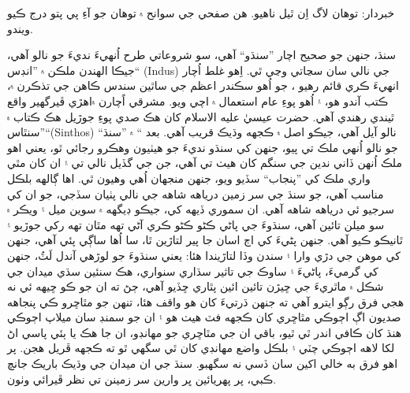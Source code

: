 \documentclass[a4paper]{article}
\begin{document}
\begin{flushright}
خبردار: توهان لاگ اِن ٿيل ناهيو. هن صفحي جي سوانح ۾ توهان جو آءِ پي پتو درج ڪيو ويندو.

سنڌ، جنهن جو صحيح اچار ”سنڌو“ آهي، سو شروعاتي طرح اُنهيءَ نديءَ جو نالو آهي، جيڪا الهندن ملڪن ۾ ”انڊس“ (Indus) جي نالي سان سڃاتي وڃي ٿي. اِهو غلط اُچار انهيءَ ڪري قائم رهيو ، جو اُهو سڪندر اعظم جي ساٿين سندس ڪاهن جي تذڪرن ۾، ڪتب آندو هو، ۽ اُهو پوءِ عام استعمال ۾ اچي ويو. مشرقي اًچارن ۾اهڙي ڦيرگهير واقع ٿيندي رهندي آهي. حضرت عيسيٰ عليه الاسلام کان هڪ صدي پوءِ جوڙيل هڪ ڪتاب ۾ ”سنٿاس“(Sinthos) نالو آيل آهي، جيڪو اصل ۾ ڪجهه وڌيڪ قريب آهي. بعد “ ۾ ”سنڌ“ جو نالو اُنهي ملڪ تي پيو، جنهن کي سنڌو نديءَ جو هيٺيون وهڪرو رجائي ٿو، يعني اهو ملڪ اُنهن ڏاني ندين جي سنگم کان هيٺ تي آهي، جن جي گڏيل نالي تي ۽ ان کان مٿي واري ملڪ کي ”پنجاب“ سڏيو ويو، جنهن منجهان اُهي وهيون ٿي. اها ڳالهه بلڪل مناسب آهي، جو سنڌ جي سر زمين درياهه شاهه جي نالي پٺيان سڏجي، جو ان کي سرجيو ئي درياهه شاهه آهي. ان سموري ڏيهه کي، جيڪو ڊيگهه ۾ سوين ميل ۽ ويڪر ۾ سو ميلن تائين آهي، سنڌوءَ جي پاڻي ڪڻو ڪڻو ڪري آڻي تهه مٿان تهه رکي جوڙيو ۽ ٿانيڪو ڪيو آهي. جنهن پڻيءَ کي اڄ اسان جا پير لتاڙين ٿا، سا اُها ساڳي پئي آهي، جنهن کي موهن جي دڙي وارا ۽ سندن وڏا لتاڙيندا هئا: يعني سنڌوءَ جو لوڙهي آندل لَٽُ، جنهن کي گرميءَ، پاڻيءَ ۽ ساوڪ جي تاثير سڌاري سنواري، هڪ سنئين سڌي ميدان جي شڪل ۾ ماٿريءَ جي ڇيڙن تائين ائين پٿاري ڇڏيو آهي، ڄڻ ته ان جو ڪو ڇيهه ئي نه هجي فرق رڳو ايترو آهي ته جنهن ڌرتيءَ کان هو واقف هئا، تنهن جو مٿاڇرو ڪي پنجاهه صديون اڳ اڄوڪي مٿاڇري کان ڪجهه فٽ هيٺ هو ۽ ان جو سمنڊ سان ميلاپ اڄوڪي هنڌ کان ڪافي اندر ٿي ٿيو، باقي ان جي مٿاڇري جو مهانڊو، ان جا هڪ يا ٻئي پاسي اڻ لکا لاهه اڄوڪي چٽي ۽ بلڪل واضع مهانڊي کان ٿي سگهي ٿو ته ڪجهه ڦريل هجن. پر اهو فرق به خالي اکين سان ڏسي نه سگهبو. سنڌ جي ان ميدان جي وڌيڪ باريڪ جانچ ڪبي، پر پهريائين ڀر وارين سر زمينن تي نظر ڦيرائي وٺون.


\end{flushright}
\end{document}
